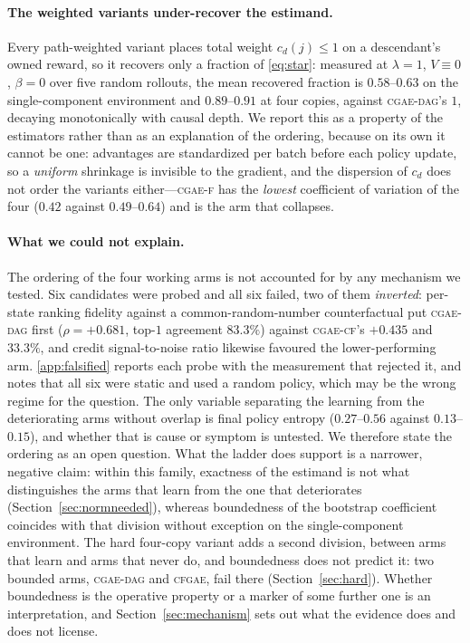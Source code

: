 \documentclass[review,authoryear,3p,times]{elsarticle}
\newcommand{\cflow}{\textsc{cgae-cf}}          %
\newcommand{\cflowraw}{\textsc{cgae-f}}        %
\newcommand{\cdag}{\textsc{cgae-dag}}          %
\newcommand{\cfgae}{\textsc{cfgae}}
\begin{document}
\paragraph{The weighted variants under-recover the estimand.} Every
path-weighted variant places total weight $c_d(j)\le1$ on a descendant's owned
reward, so it recovers only a fraction of \eqref{eq:star}: measured at
$\lambda=1$, $V\equiv0$, $\beta=0$ over five random rollouts, the mean recovered
fraction is $0.58$--$0.63$ on the single-component environment and
$0.89$--$0.91$ at four copies, against \cdag's $1$, decaying monotonically with
causal depth. We report this as a property of the estimators rather than as an
explanation of the ordering, because on its own it cannot be one: advantages are
standardized per batch before each policy update, so a \emph{uniform} shrinkage
is invisible to the gradient, and the dispersion of $c_d$ does not order the
variants either---\cflowraw{} has the \emph{lowest} coefficient of variation of
the four ($0.42$ against $0.49$--$0.64$) and is the arm that collapses.

\paragraph{What we could not explain.} The ordering of the four working arms is
not accounted for by any mechanism we tested. Six candidates were probed and all
six failed, two of them \emph{inverted}: per-state ranking fidelity against a
common-random-number counterfactual put \cdag{} first ($\rho=+0.681$, top-$1$
agreement $83.3\%$) against \cflow's $+0.435$ and $33.3\%$, and credit
signal-to-noise ratio likewise favoured the lower-performing arm.
\ref{app:falsified} reports each probe with the measurement that
rejected it, and notes that all six were static and used a random policy, which
may be the wrong regime for the question. The only variable separating the
learning from the deteriorating arms without overlap is final policy entropy
($0.27$--$0.56$ against $0.13$--$0.15$), and whether that is cause or symptom is
untested. We therefore state the ordering as an open question. What the ladder
does support is a narrower, negative claim: within this family, exactness of the
estimand is not what distinguishes the arms that learn from the one that
deteriorates (Section~\ref{sec:normneeded}), whereas boundedness of the
bootstrap coefficient coincides with that division without exception on the
single-component environment. The hard four-copy variant adds a second
division, between arms that learn and arms that never do, and boundedness does
not predict it: two bounded arms, \cdag{} and \cfgae, fail there
(Section~\ref{sec:hard}). Whether
boundedness is the operative property or a marker of some further one is an
interpretation, and Section~\ref{sec:mechanism} sets out what the evidence does
and does not license.
\end{document}
